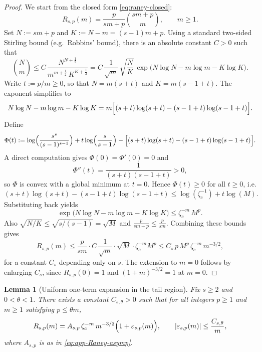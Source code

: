 \documentclass[11pt]{amsart}
\numberwithin{equation}{section}
\theoremstyle{plain}
\newtheorem{lemma}[theorem]{Lemma}
\theoremstyle{definition}
\theoremstyle{remark}
\begin{document}
\begin{proof}
	We start from the closed form \eqref{eq:raney-closed}:
	\[
		R_{s,p}(m)=\frac{p}{sm+p}\binom{sm+p}{m},\qquad m\ge1.
	\]
	Set $N:=sm+p$ and $K:=N-m=(s-1)m+p$. Using a standard two-sided Stirling bound
	(e.g.\ Robbins' bound), there is an absolute constant $C>0$ such that
	\[
		\binom{N}{m}
		\le
		C\,
		\frac{N^{N+\frac12}}{m^{m+\frac12}\,K^{K+\frac12}}
		=
		C\,
		\frac{1}{\sqrt{m}}\,
		\sqrt{\frac{N}{K}}\,
		\exp\!\bigl(N\log N-m\log m-K\log K\bigr).
	\]
	Write $t:=p/m\ge0$, so that $N=m(s+t)$ and $K=m(s-1+t)$. The exponent simplifies to
	\[
		N\log N-m\log m-K\log K
		=
		m\Bigl[(s+t)\log(s+t)-(s-1+t)\log(s-1+t)\Bigr].
	\]
	Define
	\[
		\Phi(t):=\log\Bigl(\frac{s^s}{(s-1)^{s-1}}\Bigr)+t\log\Bigl(\frac{s}{s-1}\Bigr)
		-\Bigl[(s+t)\log(s+t)-(s-1+t)\log(s-1+t)\Bigr].
	\]
	A direct computation gives $\Phi(0)=\Phi'(0)=0$ and
	\[
		\Phi''(t)=\frac{1}{(s+t)(s-1+t)}>0,
	\]
	so $\Phi$ is convex with a global minimum at $t=0$. Hence $\Phi(t)\ge0$ for all $t\ge0$, i.e.
	\[
		(s+t)\log(s+t)-(s-1+t)\log(s-1+t)
		\le
		\log(\zeta_c^{-1})+t\log(M).
	\]
	Substituting back yields
	\[
		\exp\bigl(N\log N-m\log m-K\log K\bigr)\le \zeta_c^{-m}\,M^{p}.
	\]
	Also $\sqrt{N/K}\le \sqrt{s/(s-1)}=\sqrt{M}$ and $\frac{p}{sm+p}\le \frac{p}{sm}$.
	Combining these bounds gives
	\[
		R_{s,p}(m)
		\le
		\frac{p}{sm}\cdot C\,\frac{1}{\sqrt{m}}\cdot \sqrt{M}\cdot \zeta_c^{-m}M^p
		\le
		C_s\,p\,M^{p}\,\zeta_c^{-m}\,m^{-3/2},
	\]
	for a constant $C_s$ depending only on $s$. The extension to $m=0$ follows by enlarging $C_s$,
	since $R_{s,p}(0)=1$ and $(1+m)^{-3/2}=1$ at $m=0$.
\end{proof}

\begin{lemma}[Uniform one-term expansion in the tail region]\label{lem:raney-uniform-expansion}
	Fix \(s\ge2\) and \(0<\theta<1\).  There exists a constant \(C_{s,\theta}>0\)
	such that for all integers \(p\ge1\) and \(m\ge1\) satisfying \(p\le \theta m\),
	\begin{equation}\label{eq:raney-uniform-expansion}
		R_{s,p}(m)
		=
		A_{s,p}\,\zeta_c^{-m}\,m^{-3/2}\Bigl(1+\varepsilon_{s,p}(m)\Bigr),
		\qquad
		|\varepsilon_{s,p}(m)|\le \frac{C_{s,\theta}}{m},
	\end{equation}
	where $A_{s,p}$ is as in \eqref{eq:app-Raney-asymp}.
\end{lemma}
\end{document}
